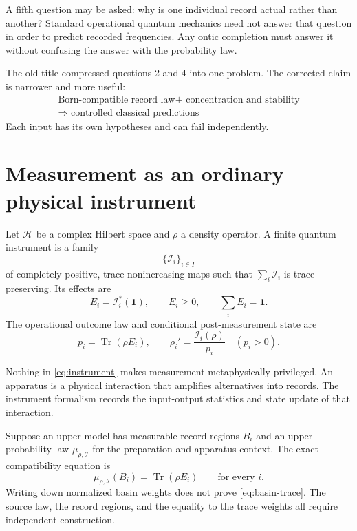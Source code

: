 \documentclass[11pt]{article}
\newcommand{\Tr}{\operatorname{Tr}}
\begin{document}
A fifth question may be asked: why is one individual record actual rather than
another? Standard operational quantum mechanics need not answer that question
in order to predict recorded frequencies. Any ontic completion must answer it
without confusing the answer with the probability law.

The old title compressed questions 2 and 4 into one problem. The corrected
claim is narrower and more useful:
\[
\boxed{
\begin{gathered}
\text{Born-compatible record law}
+\text{ concentration and stability}\\
\Longrightarrow
\text{ controlled classical predictions}
\end{gathered}
}
\]
Each input has its own hypotheses and can fail independently.

\section{Measurement as an ordinary physical instrument}

Let \(\mathcal{H}\) be a complex Hilbert space and \(\rho\) a density operator.
A finite quantum instrument is a family
\[
\{\mathcal{I}_i\}_{i\in I}
\]
of completely positive, trace-nonincreasing maps such that
\(\sum_i\mathcal{I}_i\) is trace preserving. Its effects are
\[
E_i=\mathcal{I}_i^*(\mathbf{1}),\qquad
E_i\geq0,\qquad
\sum_iE_i=\mathbf{1}.
\]
The operational outcome law and conditional post-measurement state are
\begin{equation}
p_i=\Tr(\rho E_i),\qquad
\rho_i'=\frac{\mathcal{I}_i(\rho)}{p_i}
\quad(p_i>0).
\label{eq:instrument}
\end{equation}

Nothing in \eqref{eq:instrument} makes measurement metaphysically privileged.
An apparatus is a physical interaction that amplifies alternatives into
records. The instrument formalism records the input-output statistics and state
update of that interaction.

Suppose an upper model has measurable record regions \(B_i\) and an upper
probability law \(\mu_{\rho,\mathcal{I}}\) for the preparation and apparatus
context. The exact compatibility equation is
\begin{equation}
\mu_{\rho,\mathcal{I}}(B_i)=\Tr(\rho E_i)
\qquad\text{for every }i.
\label{eq:basin-trace}
\end{equation}
Writing down normalized basin weights does not prove
\eqref{eq:basin-trace}. The source law, the record regions, and the equality to
the trace weights all require independent construction.
\end{document}
